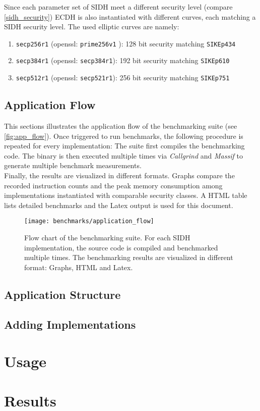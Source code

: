Since each parameter set of SIDH meet a different security level (compare \autoref{sidh_security}) ECDH is also instantiated with different curves, each matching a SIDH security level. The used elliptic curves are namely:
\begin{enumerate}
\item \texttt{secp256r1} (openssl: \texttt{prime256v1} \parencite{turner2009elliptic}): 128 bit security matching \texttt{SIKEp434} \parencite{brown2010sec}
\item \texttt{secp384r1} (openssl: \texttt{secp384r1}): 192 bit security matching \texttt{SIKEp610} \parencite{brown2010sec}
\item \texttt{secp512r1} (openssl: \texttt{secp521r1}): 256 bit security  matching \texttt{SIKEp751} \parencite{brown2010sec}
\end{enumerate}

\subsection{Application Flow}
This sections illustrates the application flow of the benchmarking suite (see \autoref{fig:app_flow}). Once triggered to run benchmarks, the following procedure is repeated for every implementation: The suite first compiles the benchmarking code. The binary is then executed multiple times via \textit{Callgrind} and \textit{Massif} to generate multiple benchmark measurements. 
\\
Finally, the results are visualized in different formats. Graphs compare the recorded instruction counts and the peak memory consumption among implementations instantiated with comparable security classes. A HTML table lists detailed benchmarks and the Latex output is used for this document.

\begin{figure}[H]
  \centering
  \texttt{[image: benchmarks/application\_flow]}
  \caption[Flow chart of the benchmarking suite.]
  {Flow chart of the benchmarking suite. For each SIDH implementation, the source code is compiled and benchmarked multiple times. The benchmarking results are visualized in different format: Graphs, HTML and Latex.
  } \label{fig:app_flow}
\end{figure}




\subsection{Application Structure}
\subsection{Adding Implementations}
\section{Usage}
\section{Results}